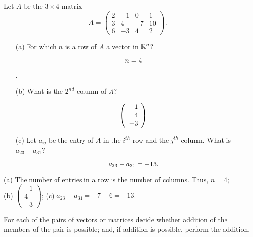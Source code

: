 \documentclass{ximera}
\begin{document}
\begin{exercise} \label{c1.1.2}
Let $A$ be the $3\times 4$ matrix
\[
A=\left(\begin{array}{rrrr} 2 & -1 & 0 & 1 \\ 3 & 4 & -7 & 10\\
        6 & -3 & 4 & 2 \end{array}\right).
\]
\begin{enumerate}
\item[(a)]  For which $n$ is a row of $A$ a vector in ${\mathbb R}^n$? \begin{prompt}\[n = 4\]\end{prompt}.
\item[(b)]  What is the $2^{nd}$ column of $A$?
  \begin{prompt}
    \[
      \left(\begin{array}{r} -1 \\ 4 \\ -3 \end{array} \right)
    \]
  \end{prompt}
\item[(c)] Let $a_{ij}$ be the entry of $A$ in the $i^{th}$ row
  and the $j^{th}$ column.  What is $a_{23}-a_{31}$?
  \begin{prompt}
    \[
      a_{23}-a_{31} = -13.
    \]
  \end{prompt}
\end{enumerate}

\begin{solution}

(a) The number of entries in a row is the number of columns.  Thus, $n = 4$; \\
(b) $\left(\begin{array}{r} -1 \\ 4 \\ -3 \end{array} \right)$;
(c) $a_{23}-a_{31} =  -7 - 6 = -13$.

\end{solution}
\end{exercise}





\problemlabel

\noindent For each of the pairs of vectors or matrices decide whether addition of the members of the pair is possible; and, if addition is possible, perform the addition.
\end{document}
